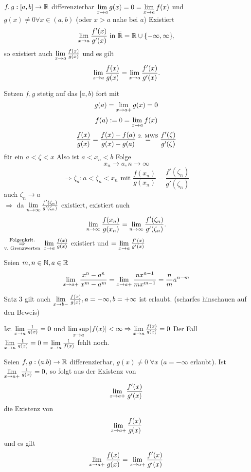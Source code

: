 \documentclass[../ana2.tex]{subfiles}
\begin{document}
\begin{satz}
    \( f,g:[a,b]\rightarrow \mathbb{R} \) differenzierbar
    \( \lim\limits_{x\rightarrow{}a}g(x) = 0 = \lim\limits_{x\rightarrow{}a}f(x) \) und
    \( g(x) \neq 0 \forall x \in (a,b) \) (oder \( x > a \) nahe bei \(a\))
    Existiert 
    \[ \lim\limits_{x\rightarrow{}a} \frac{f'(x)}{g'(x)} 
    \text{ in } \bar{\mathbb{R}} = \mathbb{R} \cup \{-\infty, \infty\}, \]
    so existiert auch \( \lim\limits_{x\rightarrow{}a} \frac{f(x)}{g(x)} \)
    und es gilt
    \[ \lim\limits_{x\rightarrow{}a} \frac{f(x)}{g(x)} 
    = \lim\limits_{x\rightarrow{}a} \frac{f'(x)}{g'(x)}. \]
\end{satz}
\begin{bew}
    Setzen \(f,g\) stetig auf das \( [a,b) \) fort mit
    \[ g(a) = \lim\limits_{x\rightarrow{}a+} g(x) = 0 \]
    \[ f(a) := 0 = \lim\limits_{x\rightarrow{}a} f(x) \]
    \[ \frac{f(x)}{g(x)} = \frac{f(x) -f(a)}{g(x)-g(a)} 
    \overset{\text{2. MWS}}{=} \frac{f'(\zeta)}{g'(\zeta)} \]
    für ein \( a < \zeta < x \)
    Also ist \( a < x_n < b \) Folge 
    \[ x_n \rightarrow a, n \rightarrow \infty \]
    \[ \Rightarrow \zeta_n : a < \zeta_n < x_n \text{ mit } 
    \frac{ f(x_n) }{ g(x_n) } 
    = \frac{ f'(\zeta_n) }{ g'(\zeta_n) } \]
    auch \( \zeta_n \rightarrow a \) \\
    \( \Rightarrow \) da \( \lim\limits_{n\rightarrow\infty} 
    \frac{f'(\zeta_n)}{g'(\zeta_n)} \) existiert, existiert 
    auch 
    \[ \lim\limits_{n\rightarrow\infty} \frac{f(x_n)}{g(x_n)} = \lim\limits_{n\rightarrow\infty} 
    \frac{f'(\zeta_n)}{g'(\zeta_n)}. \]
    \( \overundersett{Folgenkrit.}{v.\ Grenzwerten}{\Rightarrow} \)
    \( \lim\limits_{x\rightarrow{}a} \frac{f(x)}{g(x)} \) existiert und 
    \( = \lim\limits_{x\rightarrow{}a} \frac{f'(x)}{g'(x)} \)
\end{bew}
\begin{bsp}
    Seien \(m,n \in \mathbb{N}, a \in \mathbb{R} \)
    \[ \lim\limits_{x\rightarrow{}a+} \frac{x^n -a^n}{x^m-a^m} =    
    \lim\limits_{x\rightarrow{}a+} \frac{nx^{n-1}}{mx^{m-1}} 
    = \frac{n}{m}a^{n-m} \]    
\end{bsp}
\begin{bem}
    Satz 3 gilt auch \( \lim\limits_{x\rightarrow{}b-} \frac{f(x)}{g(x)},
    a=-\infty, b=+\infty \) ist erlaubt. (scharfes hinschauen
    auf den Beweis)
\end{bem}
\begin{bem}
    Ist \( \lim\limits_{x\rightarrow{}a} \frac{1}{g(x)} = 0 \) und \( \limsup\limits_{x\rightarrow{}a}
    \left|f(x)\right| < \infty \Rightarrow \lim\limits_{x\rightarrow{}a} \frac{f(x)}{g(x)} = 0 \)
    Der Fall \( \lim\limits_{x\rightarrow{}a} \frac{1}{g(x)} = 0 
    = \lim\limits_{x\rightarrow{}a} \frac{1}{f(x)} \) fehlt noch.
\end{bem}
\begin{satz}
    Seien \( f,g : (a.b) \rightarrow \mathbb{R} \) differenzierbar,
    \( g(x) \neq 0 \;\forall x  \) (\(a = -\infty\) erlaubt).
    Ist \( \lim\limits_{x\rightarrow{}a+} \frac{1}{g(x)} = 0 \), so folgt aus der 
    Existenz von 
    \[ \lim\limits_{x\rightarrow{}a+} \frac{f'(x)}{g'(x)} \] 
    die Existenz von
    \[ \lim\limits_{x\rightarrow{}a+} \frac{f(x)}{g(x)} \]
    und es gilt
    \[ \lim\limits_{x\rightarrow{}a+} \frac{f(x)}{g(x)} 
    = \lim\limits_{x\rightarrow{}a+} \frac{f'(x)}{g'(x)} \]
\end{satz}
\end{document}
